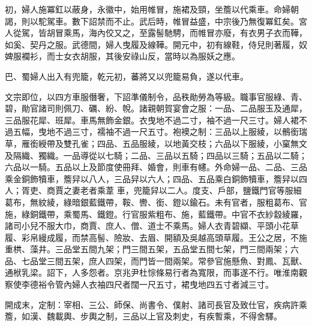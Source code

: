 \begin{pinyinscope}
 初，婦人施冪釭以蔽身，永徽中，始用帷冒，施裙及頸，坐簷以代乘車。命婦朝謁，則以駝駕車。數下詔禁而不止。武后時，帷冒益盛，中宗後乃無復冪釭矣。宮人從駕，皆胡冒乘馬，海內佼又之，至露髻馳騁，而帷冒亦廢，有衣男子衣而鞾，如奚、契丹之服。武德間，婦人曳履及線鞾。開元中，初有線鞋，侍兒則著履，奴婢服襴衫，而士女衣胡服，其後安祿山反，當時以為服妖之應。



 巴、蜀婦人出入有兜籠，乾元初，蕃將又以兜籠易負，遂以代車。


文宗即位，以四方車服僭奢，下詔準儀制令，品秩勛勞為等級。職事官服綠、青、碧，勛官諸司則佩刀、礪、紛、帨。諸親朝賀宴會之服：一品、二品服玉及通犀，三品服花犀、班犀。車馬無飾金銀。衣曳地不過二寸，袖不過一尺三寸。婦人裙不過五幅，曳地不過三寸，襦袖不過一尺五寸。袍襖之制：三品以上服綾，以鶻銜瑞草，雁銜綬帶及雙孔雀；四品、五品服綾，以地黃交枝；六品以下服綾，小窠無文及隔織、獨織。一品導從以七騎；二品、三品以五騎；四品以三騎；五品以二騎；六品以一騎。五品以上及節度使冊拜、婚會，則車有幰。外命婦一品、二品、三品乘金銅飾犢車，簷舁以八人，三品舁以六人；四品、五品乘白銅飾犢車，簷舁以四人；胥吏、商賈之妻老者乘葦
 車，兜籠舁以二人。度支、戶部，鹽鐵門官等服細葛布，無紋綾，綠暗銀藍鐵帶，鞍、轡、銜、鐙以鍮石。未有官者，服粗葛布、官施，綠銅鐵帶，乘蜀馬、鐵鐙。行官服紫粗布、施，藍鐵帶。中官不衣紗縠綾羅，諸司小兒不服大巾，商賈、庶人、僧、道士不乘馬。婦人衣青碧纈、平頭小花草履、彩帛縵成履，而禁高髻、險妝、去眉、開額及吳越高頭草履。王公之居，不施重栱、藻井。三品堂五間九架；門三間五架，五品堂五間七架，門三間兩架；六品、七品堂三間五架，庶人四架，而門皆一間兩架。常參官施懸魚、對鳳、瓦獸、通栿乳梁。詔下，人多怨者。京兆尹杜悰條易行者為寬限，而事遂不行。唯淮南觀察使李德裕令管內婦人衣袖四尺者闊一尺五寸，裙曳地四五寸者減三寸。



 開成末，定制：宰相、三公、師保、尚書令、僕射、諸司長官及致仕官，疾病許乘簷，如漢、魏載輿、步輿之制，三品以上官及刺史，有疾暫乘，不得舍驛。



\end{pinyinscope}